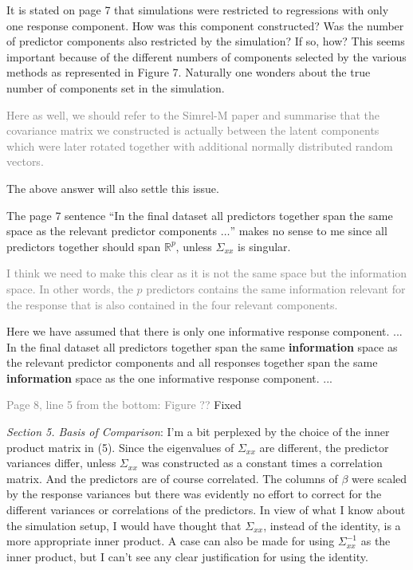 \documentclass[12pt, a4paper]{scrartcl}
\begin{document}
It is stated on page 7 that simulations were restricted to regressions with only one response component. How was this component constructed? Was the number of predictor components also restricted by the simulation? If so, how? This seems important because of the different numbers of components selected by the various methods as represented in Figure 7. Naturally one wonders about the true number of components set in the simulation.

\textcolor{gray}{Here as well, we should refer to the Simrel-M paper and summarise that the covariance matrix we constructed is actually between the latent components which were later rotated together with additional normally distributed random vectors.}

\textcolor{answers}{The above answer will also settle this issue.}

The page 7 sentence ``In the final dataset all predictors together span the same space as the relevant predictor components $\ldots$'' makes no sense to me since all predictors together should span $\mathbb{R}^p$, unless $\Sigma_{xx}$ is singular.

\textcolor{gray}{I think we need to make this clear as it is not the same space but the information space. In other words, the $p$ predictors contains the same information relevant for the response that is also contained in the four relevant components.}

\textcolor{answers}{Here we have assumed that there is only one informative response component. ... In the final dataset all predictors together span the same \textbf{information} space as the relevant predictor components and all responses together span the same \textbf{information} space as the one informative response component. ...}

\textcolor{gray}{Page 8, line 5 from the bottom: Figure ??} \textcolor{answers}{Fixed}

\textit{Section 5. Basis of Comparison}: I’m a bit perplexed by the choice of the inner product matrix in (5). Since the eigenvalues of $\Sigma_{xx}$ are different, the predictor variances differ, unless $\Sigma_{xx}$ was constructed as a constant times a correlation matrix. And the predictors are of course correlated. The columns of $\beta$ were scaled by the response variances but there was evidently no effort to correct for the different variances or correlations of the predictors. In view of what I know about the simulation setup, I would have thought that $\Sigma_{xx}$, instead of the identity, is a more appropriate inner product. A case can also be made for using $\Sigma_{xx}^{-1}$ as the inner product, but I can’t see any clear justification for using the identity.
\end{document}

